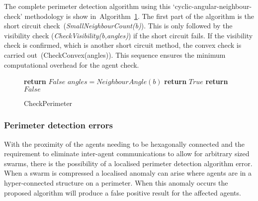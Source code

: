 \documentclass{ieeeaccess}
\begin{document}
The complete perimeter detection algorithm using this `cyclic-angular-neighbour-check' methodology is show in~Algorithm~\ref{algo:checkPerimeter}. The first part of the algorithm is the short circuit check~(\textit{SmallNeighbourCount(b)}). This is only followed by the visibility check (\textit{CheckVisibility(b,angles)}) if the short circuit fails. If the visibility check is confirmed, which is another short circuit method, the convex check is carried out~(CheckConvex(angles)). This sequence ensures the minimum computational overhead for the agent check. 

\begin{figure}
\begin{algorithmic}[1]
	\State \textbf{return} $False$ 
\EndIf
\State $angles = NeighbourAngle(b)$
		\State \textbf{return} $True$ 
	\EndIf
\EndIf
\State \textbf{return} $False$ 
\EndProcedure
\end{algorithmic}
\caption{CheckPerimeter}
\label{algo:checkPerimeter}
\end{figure}


\subsubsection{Perimeter detection errors\label{section:PerimeterErrorLocalisation}}
With the proximity of the agents needing to be hexagonally connected and the requirement to eliminate inter-agent communications to allow for arbitrary sized swarms, there is the possibility of a localised perimeter detection algorithm error. When a swarm is compressed a localised anomaly can arise where agents are in a hyper-connected structure on a perimeter. When this anomaly occurs the proposed algorithm will produce a false positive result for the affected agents. 

\end{document}
